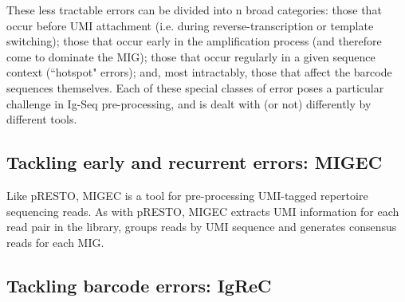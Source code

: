 These less tractable errors can be divided into n broad categories: those that occur before UMI attachment (i.e. during reverse-transcription or template switching); those that occur early in the amplification process (and therefore come to dominate the MIG); those that occur regularly in a given sequence context (``hotspot" errors); and, most intractably, those that affect the barcode sequences themselves. Each of these special classes of error poses a particular challenge in Ig-Seq pre-processing, and is dealt with (or not) differently by different tools. %

\subsection{Tackling early and recurrent errors: MIGEC}

Like pRESTO, MIGEC \citep{shugay2014migec} is a tool for pre-processing UMI-tagged repertoire sequencing reads. As with pRESTO, MIGEC extracts UMI information for each read pair in the library, groups reads by UMI sequence and generates consensus reads for each MIG. 

\subsection{Tackling barcode errors: IgReC}